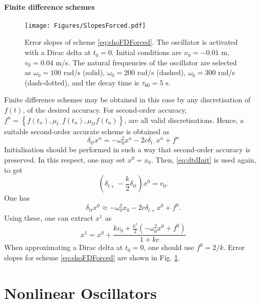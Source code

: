 \documentclass[11pt,twoside,a4paper,english]{book}
\newcommand{\dtp}{\delta_{t+}}
\newcommand{\dtd}{\delta_{t\cdot}}
\newcommand{\dtt}{\delta_{tt}}
\newcommand{\mtd}{\mu_{t\cdot}}
\newcommand{\mtt}{\mu_{tt}}
\begin{document}
\subsubsection{Finite difference schemes}
\begin{figure}[hbt]
    \centering
    \texttt{[image: Figures/SlopesForced.pdf]}
    \caption{Error slopes of scheme \eqref{eq:shoFDForced}. The oscillator is activated with a Dirac delta at $t_0=0$. Initial conditions are $x_0=-0.01$ m, $v_0=0.04$ m/s. The natural frequencies of the oscillator are selected as $\omega_0 = 100$ rad/s (solid), $\omega_0 = 200$ rad/s (dashed), $\omega_0 = 300$ rad/s (dash-dotted), and the decay time is $\tau_{60} = 5$ s.}\label{fig:ErrSlopesForced}
\end{figure}
Finite difference schemes may be obtained in this case by any discretisation of $f(t)$, of the desired accuracy. For second-order accuracy, $f^n = \left\{f(t_n),\mtd f(t_n), \mtt f(t_n) \right\}$, are all valid discretisations. Hence, a suitable second-order accurate scheme is obtained as
\begin{equation}\label{eq:shoFDForced}
    \dtt x^n = -\omega_0^2 x^n -2c\dtd x^n + f^n
\end{equation}
Initialisation should be performed in such a way that second-order accuracy is preserved. In this respect, one may set $x^0 = x_0$. Then,
\eqref{eq:dtdInit} is used again, to get
\begin{equation}
    (\dtp - \frac{k}{2}\dtt)x^0 = v_0.
\end{equation}
One has
\begin{equation}
    \dtt x^0 \approx -\omega_0^2 x_0 - 2c \dtp x^0 + f^0.
\end{equation}
Using these, one can extract $x^1$ as 
\begin{equation}
    x^1 = x^0 + \frac{k v_0 + \frac{k^2}{2}\left(-\omega_0^2 x^0 + f^0 \right)}{1+kc}
\end{equation}
When approximating a Dirac delta at $t_0=0$, one should use $f^0 = 2/k$. Error slopes for scheme \eqref{eq:shoFDForced} are shown in Fig.  \ref{fig:ErrSlopesForced}.


\chapter{Nonlinear Oscillators}
\end{document}

